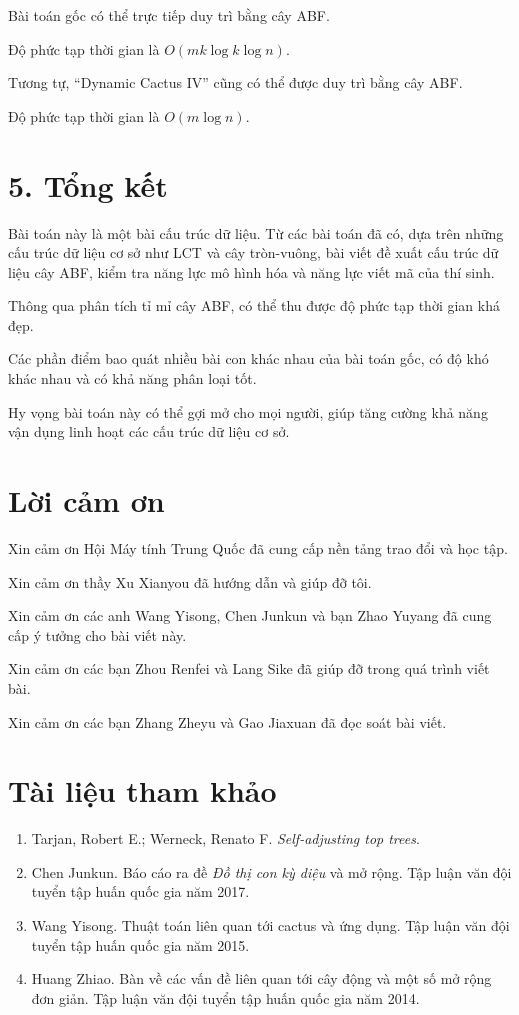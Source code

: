 \documentclass[11pt]{article}
\begin{document}
Bài toán gốc có thể trực tiếp duy trì bằng cây ABF.

Độ phức tạp thời gian là \(O(mk\log k\log n)\).

Tương tự, ``Dynamic Cactus IV'' cũng có thể được duy trì bằng cây ABF.

Độ phức tạp thời gian là \(O(m\log n)\).

\section*{5. Tổng kết}

Bài toán này là một bài cấu trúc dữ liệu. Từ các bài toán đã có, dựa trên
những cấu trúc dữ liệu cơ sở như LCT và cây tròn-vuông, bài viết đề xuất cấu
trúc dữ liệu cây ABF, kiểm tra năng lực mô hình hóa và năng lực viết mã của
thí sinh.

Thông qua phân tích tỉ mỉ cây ABF, có thể thu được độ phức tạp thời gian khá
đẹp.

Các phần điểm bao quát nhiều bài con khác nhau của bài toán gốc, có độ khó
khác nhau và có khả năng phân loại tốt.

Hy vọng bài toán này có thể gợi mở cho mọi người, giúp tăng cường khả năng
vận dụng linh hoạt các cấu trúc dữ liệu cơ sở.

\section*{Lời cảm ơn}

Xin cảm ơn Hội Máy tính Trung Quốc đã cung cấp nền tảng trao đổi và học tập.

Xin cảm ơn thầy Xu Xianyou đã hướng dẫn và giúp đỡ tôi.

Xin cảm ơn các anh Wang Yisong, Chen Junkun và bạn Zhao Yuyang đã cung cấp ý
tưởng cho bài viết này.

Xin cảm ơn các bạn Zhou Renfei và Lang Sike đã giúp đỡ trong quá trình viết
bài.

Xin cảm ơn các bạn Zhang Zheyu và Gao Jiaxuan đã đọc soát bài viết.

\section*{Tài liệu tham khảo}

\begin{enumerate}
  \item Tarjan, Robert E.; Werneck, Renato F. \emph{Self-adjusting top trees}.
  \item Chen Junkun. Báo cáo ra đề \emph{Đồ thị con kỳ diệu} và mở rộng. Tập
        luận văn đội tuyển tập huấn quốc gia năm 2017.
  \item Wang Yisong. Thuật toán liên quan tới cactus và ứng dụng. Tập luận
        văn đội tuyển tập huấn quốc gia năm 2015.
  \item Huang Zhiao. Bàn về các vấn đề liên quan tới cây động và một số mở
        rộng đơn giản. Tập luận văn đội tuyển tập huấn quốc gia năm 2014.
\end{enumerate}
\end{document}
